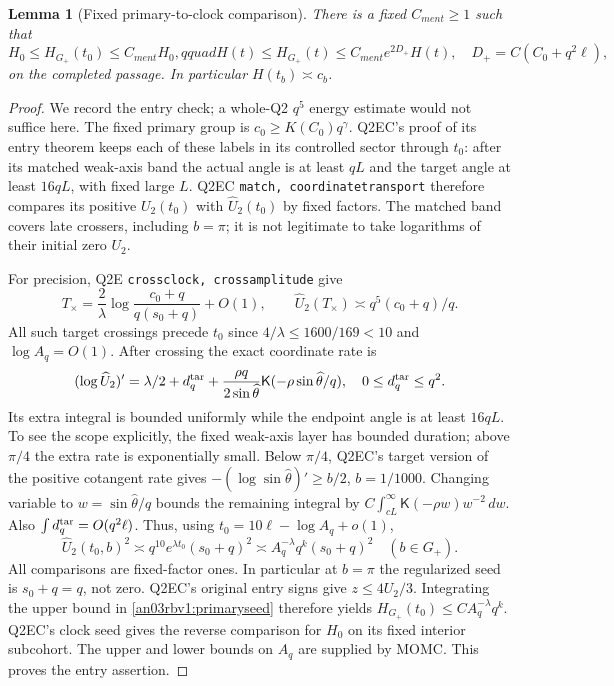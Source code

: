\documentclass[11pt]{article}
\numberwithin{equation}{section}
\newtheorem{lemma}[theorem]{Lemma}
\theoremstyle{remark}\newtheorem{remark}[theorem]{Remark}
\newcommand{\dd}{\,d}
\newcommand{\Gp}{G_+}
\newcommand{\Kfun}{\mathsf K}
\begin{document}
\begin{lemma}[Fixed primary-to-clock comparison]
\label{an03rbv1:clockcomparison}
There is a fixed $C_{
m ent}\ge1$ such that
\begin{equation}
 H_0\le H_{\Gp}(t_0)\le C_{
m ent}H_0,qquad
 H(t)\le H_{\Gp}(t)\le C_{
m ent}e^{2D_+}H(t),
 \quad D_+=C(C_0+q^2\ell),
 \label{an03rbv1:primaryclock}
\end{equation}
on the completed passage. In particular $H(t_b)\asymp c_b$.
\end{lemma}
\begin{proof}
We record the entry check; a whole-Q2 $q^5$ energy estimate would
not suffice here. The fixed primary group is
$c_0\ge K(C_0)q^\gamma$. Q2EC's proof of its entry theorem
keeps each of these labels in its controlled sector through $t_0$:
after its matched weak-axis band the actual angle is at least $qL$
and the target angle at least $16qL$, with fixed large $L$.
Q2EC \texttt{match, coordinatetransport} therefore compares its
positive $U_2(t_0)$ with $\widehat U_2(t_0)$ by fixed factors.
The matched band covers late crossers, including $b=\pi$; it
is not legitimate to take logarithms of their initial zero $U_2$.

For precision, Q2E \texttt{crossclock, crossamplitude} give
\[
 T_\times=\frac2\lambda\log\frac{c_0+q}{q(s_0+q)}+O(1),
 \qquad
 \widehat U_2(T_\times)\asymp q^5(c_0+q)/q.
\]
All such target crossings precede $t_0$ since
$4/\lambda\le1600/169<10$ and $\log A_q=O(1)$.
After crossing the exact coordinate rate is
\[
 (\log\widehat U_2)'=\lambda/2+d_q^{\rm tar}
       +\frac{\rho q}{2\sin\widehat\theta}
                         \Kfun(-\rho\sin\widehat\theta/q),
 \quad 0\le d_q^{\rm tar}\le q^2.
\]
Its extra integral is bounded uniformly while the endpoint angle
is at least $16qL$. To see the scope explicitly, the fixed weak-axis
layer has bounded duration; above $\pi/4$ the extra rate is
exponentially small. Below $\pi/4$, Q2EC's target version of the
positive cotangent rate gives
$-(\log\sin\widehat\theta)'\ge b/2$, $b=1/1000$.
Changing variable to $w=\sin\widehat\theta/q$ bounds the remaining
integral by $C\int_{cL}^{\infty}\Kfun(-\rho w)w^{-2}\dd w$.
Also $\int d_q^{\rm tar}=O(q^2\ell)$.
Thus, using $t_0=10\ell-\log A_q+o(1)$,
\begin{equation}
 \widehat U_2(t_0,b)^2
 \asymp q^{10}e^{\lambda t_0}(s_0+q)^2
 \asymp A_q^{-\lambda}q^k(s_0+q)^2
 \quad(b\in\Gp).
 \label{an03rbv1:primaryseed}
\end{equation}
All comparisons are fixed-factor ones. In particular at $b=\pi$
the regularized seed is $s_0+q=q$, not zero.
Q2EC's original entry signs give $z\le4U_2/3$.
Integrating the upper bound in \eqref{an03rbv1:primaryseed}
therefore yields $H_{\Gp}(t_0)\le C A_q^{-\lambda}q^k$.
Q2EC's clock seed gives the reverse comparison for $H_0$ on its
fixed interior subcohort. The upper and lower bounds on $A_q$
are supplied by MOMC. This proves the entry assertion.


\end{proof}
\end{document}
